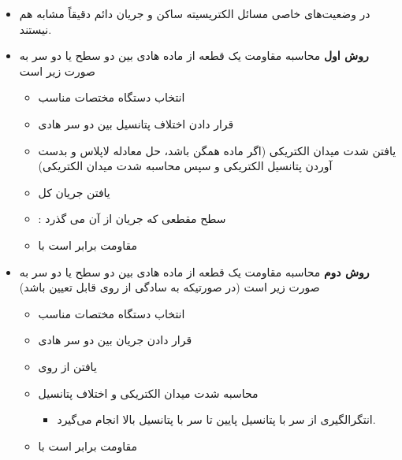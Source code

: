 \begin{ELunit}

\begin{itemize}
\tightlist
\item
  در وضعیت‌های خاصی مسائل الکتریسیته ساکن و جریان دائم دقیقاً مشابه هم نیستند.
\item
  \textbf{روش اول} محاسبه مقاومت یک قطعه از ماده هادی بین دو سطح یا دو سر به صورت زیر است

  \begin{itemize}
  \tightlist
  \item
    انتخاب دستگاه مختصات مناسب
  \item
    قرار دادن اختلاف پتانسیل  بین دو سر هادی
  \item
    یافتن شدت میدان الکتریکی (اگر ماده همگن باشد، حل معادله لاپلاس و بدست آوردن پتانسیل الکتریکی و سپس محاسبه شدت میدان الکتریکی)
  \item
    یافتن جریان کل
  \item
    : سطح مقطعی که جریان از آن می گذرد
  \item
    مقاومت برابر است با 
  \end{itemize}
\item
  \textbf{روش دوم} محاسبه مقاومت یک قطعه از ماده هادی بین دو سطح یا دو سر به صورت زیر است (در صورتیکه  به سادگی از روی  قابل تعیین باشد)

  \begin{itemize}
  \tightlist
  \item
    انتخاب دستگاه مختصات مناسب
  \item
    قرار دادن جریان  بین دو سر هادی
  \item
    یافتن  از روی 
  \item
    محاسبه شدت میدان الکتریکی  و اختلاف پتانسیل 

    \begin{itemize}
    \tightlist
    \item
      انتگرالگیری از سر با پتانسیل پایین تا سر با پتانسیل بالا انجام می‌گیرد.
    \end{itemize}
  \item
    مقاومت برابر است با 
  \end{itemize}
\end{itemize}

\end{ELunit}

